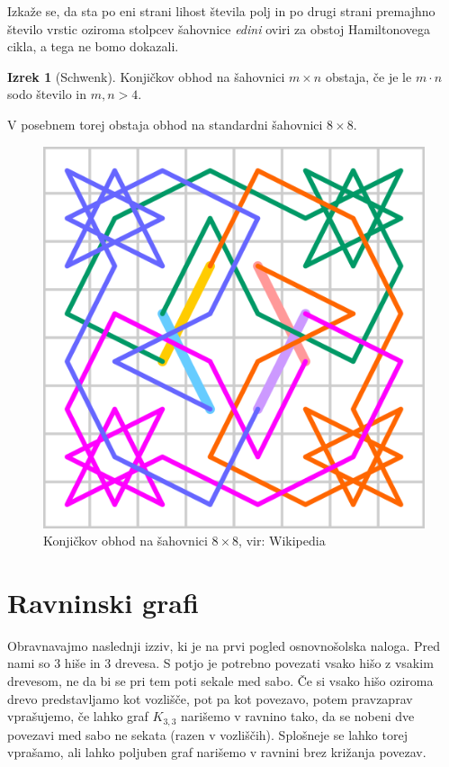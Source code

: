 \documentclass[11pt]{book}
\theoremstyle{definition}
\theoremstyle{zgled}
\theoremstyle{odprtproblem}
\theoremstyle{domacanaloga}
\theoremstyle{izrek}
\newtheorem*{izrek}{Izrek}
\begin{document}
Izkaže se, da sta po eni strani lihost števila polj in po drugi strani premajhno število vrstic oziroma stolpcev šahovnice \emph{edini} oviri za obstoj Hamiltonovega cikla, a tega ne bomo dokazali.

\begin{izrek}[Schwenk]
    Konjičkov obhod na šahovnici $m \times n$ obstaja, če je le $m \cdot n$ sodo število in $m, n > 4$.
\end{izrek}

V posebnem torej obstaja obhod na standardni šahovnici $8 \times 8$.

\begin{figure}[h]
    \centering
    \includegraphics[width=0.5\linewidth]{img/grafi-konjicek.png}
    \caption{Konjičkov obhod na šahovnici $8 \times 8$, vir: Wikipedia}
\end{figure}  

\section{Ravninski grafi}

Obravnavajmo naslednji izziv, ki je na prvi pogled osnovnošolska naloga. Pred nami so $3$ hiše in $3$ drevesa. S potjo je potrebno povezati vsako hišo z vsakim drevesom, ne da bi se pri tem poti sekale med sabo. Če si vsako hišo oziroma drevo predstavljamo kot vozlišče, pot pa kot povezavo, potem pravzaprav vprašujemo, če lahko graf $K_{3,3}$ narišemo v ravnino tako, da se nobeni dve povezavi med sabo ne sekata (razen v vozliščih). Splošneje se lahko torej vprašamo, ali lahko poljuben graf narišemo v ravnini brez križanja povezav.
\end{document}
